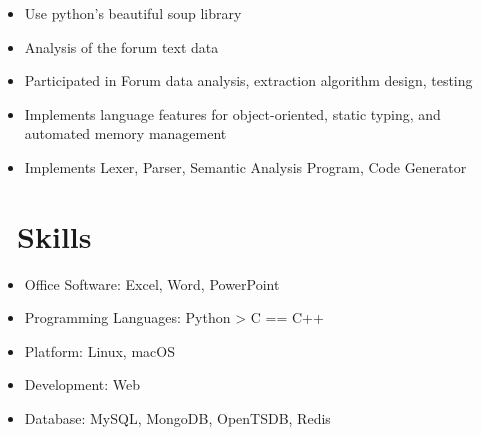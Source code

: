 \documentclass{resume}
\begin{document}
\begin{itemize}
  \item Use python's beautiful soup library
  \item Analysis of the forum text data
  \item Participated in Forum data analysis, extraction algorithm design, testing
\end{itemize}

\begin{itemize}
  \item Implements language features for object-oriented, static typing, and automated memory management
  \item Implements Lexer, Parser, Semantic Analysis Program, Code Generator
\end{itemize}


\section{\faCogs\ Skills}
\begin{itemize}[parsep=0.5ex]
  \item Office Software: Excel, Word, PowerPoint
  \item Programming Languages: Python > C == C++
  \item Platform: Linux, macOS
  \item Development: Web
  \item Database: MySQL, MongoDB, OpenTSDB, Redis
\end{itemize}



%
%
\end{document}

